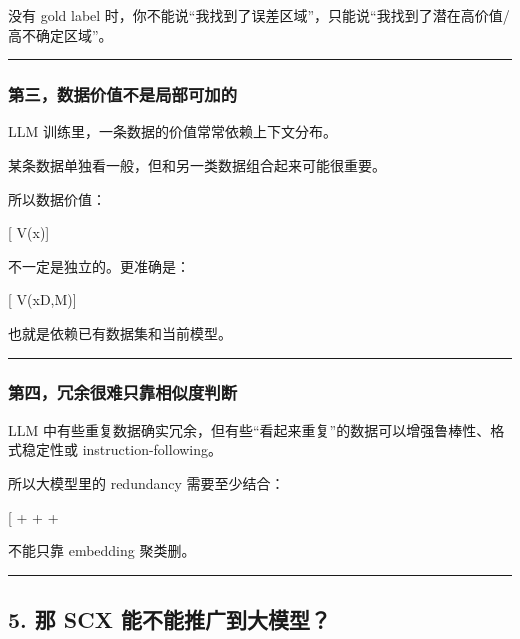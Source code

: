 \documentclass[
  12pt,
]{ctexart}
\begin{document}
没有 gold label
时，你不能说``我找到了误差区域''，只能说``我找到了潜在高价值/高不确定区域''。

\begin{center}\rule{0.5\linewidth}{0.5pt}\end{center}

\subsubsection{第三，数据价值不是局部可加的}\label{ux7b2cux4e09ux6570ux636eux4ef7ux503cux4e0dux662fux5c40ux90e8ux53efux52a0ux7684}

LLM 训练里，一条数据的价值常常依赖上下文分布。

某条数据单独看一般，但和另一类数据组合起来可能很重要。

所以数据价值：

{[} V(x){]}

不一定是独立的。更准确是：

{[} V(x\mid \mathcal D,\mathcal M){]}

也就是依赖已有数据集和当前模型。

\begin{center}\rule{0.5\linewidth}{0.5pt}\end{center}

\subsubsection{第四，冗余很难只靠相似度判断}\label{ux7b2cux56dbux5197ux4f59ux5f88ux96beux53eaux9760ux76f8ux4f3cux5ea6ux5224ux65ad}

LLM
中有些重复数据确实冗余，但有些``看起来重复''的数据可以增强鲁棒性、格式稳定性或
instruction-following。

所以大模型里的 redundancy 需要至少结合：

{[}  +  +
 + \text{downstream effect}{]}

不能只靠 embedding 聚类删。

\begin{center}\rule{0.5\linewidth}{0.5pt}\end{center}

\subsection{5. 那 SCX
能不能推广到大模型？}\label{ux90a3-scx-ux80fdux4e0dux80fdux63a8ux5e7fux5230ux5927ux6a21ux578b}
\end{document}
